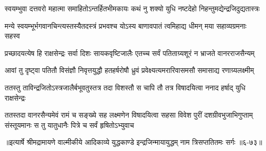 \twolineshloka
{स्वयम्भुवा दत्तवरो महात्मा समाहितोऽन्तर्हितभीमकायः}
{कथं नु शक्यो युधि नष्टदेहो निहन्तुमद्येन्द्रजिदुद्यतास्त्रः} %

\twolineshloka
{मन्ये स्वयम्भूर्भगवानचिन्त्यस्तस्यैतदस्त्रं प्रभवश्च योऽस्य}
{बाणावपातं त्वमिहाद्य धीमन् मया सहाव्यग्रमनाः सहस्व} %

\twolineshloka
{प्रच्छादयत्येष हि राक्षसेन्द्रः सर्वा दिशः सायकवृष्टिजालैः}
{एतच्च सर्वं पतिताग्र्यशूरं न भ्राजते वानरराजसैन्यम्} %

\twolineshloka
{आवां तु दृष्ट्वा पतितौ विसंज्ञौ निवृत्तयुद्धौ हतहर्षरोषौ}
{ध्रुवं प्रवेक्ष्यत्यमरारिवासमसौ समासाद्य रणाग्र्यलक्ष्मीम्} %

\twolineshloka
{ततस्तु ताविन्द्रजितोऽस्त्रजालैर्बभूवतुस्तत्र तदा विशस्तौ}
{स चापि तौ तत्र विषादयित्वा ननाद हर्षाद् युधि राक्षसेन्द्रः} %

\threelineshloka
{ततस्तदा वानरसैन्यमेवं रामं च सङ्ख्ये सह लक्ष्मणेन}
{विषादयित्वा सहसा विवेश पुरीं दशग्रीवभुजाभिगुप्ताम्}
{संस्तूयमानः स तु यातुधानैः पित्रे च सर्वं हृषितोऽभ्युवाच} %


॥इत्यार्षे श्रीमद्रामायणे वाल्मीकीये आदिकाव्ये युद्धकाण्डे इन्द्रजिन्मायायुद्धम् नाम त्रिसप्ततितमः सर्गः ॥६-७३॥
